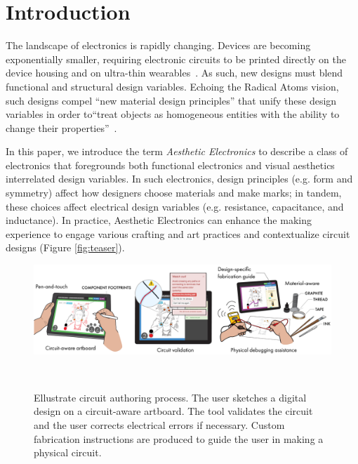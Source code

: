\documentclass{sigchi}
\begin{document}

\section{Introduction}

The landscape of electronics is rapidly changing. Devices are becoming exponentially smaller, requiring electronic circuits to be printed directly on the device housing and on ultra-thin wearables~\cite{MacDonald:2014ju,Kim:2014iq}. As such, new designs must blend functional and structural design variables. Echoing the Radical Atoms vision, such designs compel ``new material design principles'' that unify these design variables in order to``treat objects as homogeneous entities with the ability to change their properties''~\cite{Ishii:2012fg}.

In this paper, we introduce the term \textit{Aesthetic Electronics} to describe a class of electronics that foregrounds both functional electronics and visual aesthetics interrelated design variables. In such electronics, design principles (e.g. form and symmetry) affect how designers choose materials and make marks; in tandem, these choices affect electrical design variables (e.g. resistance, capacitance, and inductance). In practice, Aesthetic Electronics can enhance the making experience to engage various crafting and art practices and contextualize circuit designs (Figure \ref{fig:teaser}).
\begin{figure}[ht]
 \vspace{-16pt}
\centering
  \includegraphics[width=\linewidth]{figures/ellustrate_system.pdf}
  \caption{Ellustrate circuit authoring process. The user sketches a digital design on a circuit-aware artboard. The tool validates the circuit and the user corrects electrical errors if necessary. Custom fabrication instructions are produced to guide the user in making a physical circuit.}~\label{fig:process_flow}
  \vspace{-16pt}
\end{figure}
\end{document}
